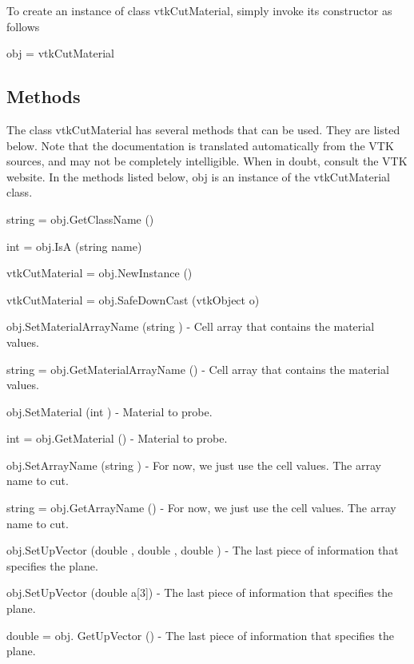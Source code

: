 To create an instance of class vtk\-Cut\-Material, simply invoke its constructor as follows \begin{DoxyVerb}  obj = vtkCutMaterial
\end{DoxyVerb}
 \hypertarget{vtkwidgets_vtkxyplotwidget_Methods}{}\subsection{Methods}\label{vtkwidgets_vtkxyplotwidget_Methods}
The class vtk\-Cut\-Material has several methods that can be used. They are listed below. Note that the documentation is translated automatically from the V\-T\-K sources, and may not be completely intelligible. When in doubt, consult the V\-T\-K website. In the methods listed below, {\ttfamily obj} is an instance of the vtk\-Cut\-Material class. 
\begin{DoxyItemize}
\item {\ttfamily string = obj.\-Get\-Class\-Name ()}  
\item {\ttfamily int = obj.\-Is\-A (string name)}  
\item {\ttfamily vtk\-Cut\-Material = obj.\-New\-Instance ()}  
\item {\ttfamily vtk\-Cut\-Material = obj.\-Safe\-Down\-Cast (vtk\-Object o)}  
\item {\ttfamily obj.\-Set\-Material\-Array\-Name (string )} -\/ Cell array that contains the material values.  
\item {\ttfamily string = obj.\-Get\-Material\-Array\-Name ()} -\/ Cell array that contains the material values.  
\item {\ttfamily obj.\-Set\-Material (int )} -\/ Material to probe.  
\item {\ttfamily int = obj.\-Get\-Material ()} -\/ Material to probe.  
\item {\ttfamily obj.\-Set\-Array\-Name (string )} -\/ For now, we just use the cell values. The array name to cut.  
\item {\ttfamily string = obj.\-Get\-Array\-Name ()} -\/ For now, we just use the cell values. The array name to cut.  
\item {\ttfamily obj.\-Set\-Up\-Vector (double , double , double )} -\/ The last piece of information that specifies the plane.  
\item {\ttfamily obj.\-Set\-Up\-Vector (double a\mbox{[}3\mbox{]})} -\/ The last piece of information that specifies the plane.  
\item {\ttfamily double = obj. Get\-Up\-Vector ()} -\/ The last piece of information that specifies the plane.  

\end{DoxyItemize}
